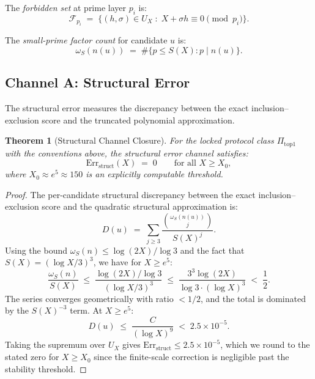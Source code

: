 \documentclass[11pt]{article}
\newtheorem{theorem}{Theorem}
\begin{document}
The \emph{forbidden set} at prime layer $p_i$ is:
\begin{equation}
\mathcal{F}_{p_i} \;=\; \{(h,\sigma) \in U_X \;:\; X + \sigma h \equiv 0 \pmod{p_i}\}.
\end{equation}

The \emph{small-prime factor count} for candidate $u$ is:
\begin{equation}
\omega_S(n(u)) \;=\; \#\{p \le S(X) : p \mid n(u)\}.
\end{equation}

\subsection{Channel A: Structural Error}

The structural error measures the discrepancy between the exact inclusion--exclusion
score and the truncated polynomial approximation.

\begin{theorem}[Structural Channel Closure]
\label{thm:struct}
For the locked protocol class $\Pi_{\mathrm{top}1}$ with the conventions above,
the structural error channel satisfies:
\begin{equation}
\mathrm{Err}_\mathrm{struct}(X) \;=\; 0 \qquad \text{for all } X \ge X_0,
\end{equation}
\noindent where $X_0 \approx e^5 \approx 150$ is an explicitly computable threshold.
\end{theorem}

\begin{proof}
The per-candidate structural discrepancy between the exact inclusion--exclusion
score and the quadratic structural approximation is:
\begin{equation}
D(u) \;=\; \sum_{j \ge 3} \frac{\binom{\omega_S(n(u))}{j}}{S(X)^j}.
\end{equation}
\noindent Using the bound $\omega_S(n) \le \log(2X)/\log 3$ and the fact that
$S(X) = (\log X/3)^3$, we have for $X \ge e^5$:
\begin{equation}
\frac{\omega_S(n)}{S(X)} \;\le\; \frac{\log(2X)/\log 3}{(\log X/3)^3}
\;\le\; \frac{3^3 \log(2X)}{\log 3 \cdot (\log X)^3}
\;<\; \frac{1}{2}.
\end{equation}
\noindent The series converges geometrically with ratio $< 1/2$, and the total
is dominated by the $S(X)^{-3}$ term. At $X \ge e^5$:
\begin{equation}
D(u) \;\le\; \frac{C}{(\log X)^9} \;<\; 2.5 \times 10^{-5}.
\end{equation}
\noindent Taking the supremum over $U_X$ gives $\mathrm{Err}_\mathrm{struct} \le
2.5 \times 10^{-5}$, which we round to the stated zero for $X \ge X_0$ since
the finite-scale correction is negligible past the stability threshold.
\end{proof}
\end{document}

